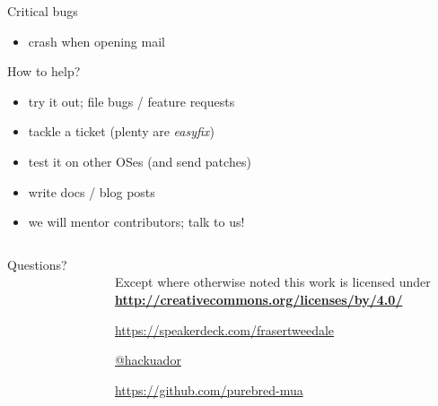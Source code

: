 \documentclass[ignorenonframetext,aspectratio=169,dvipsnames]{beamer}
\begin{document}
\begin{frame}{Critical bugs}
    \begin{itemize}
        \item crash when opening mail %
    \end{itemize}
\end{frame}

\begin{frame}{How to help?}
    \begin{itemize}
        \item try it out; file bugs / feature requests
        \item tackle a ticket (plenty are {\em easyfix})
        \item test it on other OSes (and send patches)
        \item write docs / blog posts
        \item we will mentor contributors; talk to us!
    \end{itemize}
\end{frame}



\begin{frame}[plain]
\begin{columns}

  \begin{column}{.4\textwidth}
    \begin{center}
    {
        \Large Questions?\\
        \medskip
        \medskip
        \def\svgwidth{.8\columnwidth}
        
    }
    \end{center}


  \end{column}

  \begin{column}{.6\textwidth}
    \hypersetup{urlcolor=black}

    \setlength{\parskip}{.5em}

    { \centering

    
    \\
    { \scriptsize
    Except where otherwise noted this work is licensed under
    }\\
    { \footnotesize
      \textbf{\url{http://creativecommons.org/licenses/by/4.0/}}
    }

    \bigskip
    \large \tt

    \url{https://speakerdeck.com/frasertweedale}

    \href{https://twitter.com/hackuador}{@hackuador}

    \url{https://github.com/purebred-mua}

    }
  \end{column}

\end{columns}
\end{frame}
\end{document}
